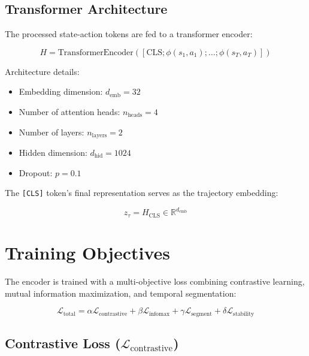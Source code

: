 \documentclass{article}
\begin{document}
\subsection{Transformer Architecture}

The processed state-action tokens are fed to a transformer encoder:

\begin{equation}
    H = \text{TransformerEncoder}([\text{CLS}; \phi(s_1, a_1); \ldots; \phi(s_T, a_T)])
\end{equation}

Architecture details:
\begin{itemize}
    \item Embedding dimension: $d_{\text{emb}} = 32$
    \item Number of attention heads: $n_{\text{heads}} = 4$
    \item Number of layers: $n_{\text{layers}} = 2$
    \item Hidden dimension: $d_{\text{hid}} = 1024$
    \item Dropout: $p = 0.1$
\end{itemize}

The \texttt{[CLS]} token's final representation serves as the trajectory embedding:

\begin{equation}
    z_\tau = H_{\text{CLS}} \in \mathbb{R}^{d_{\text{emb}}}
\end{equation}

\section{Training Objectives}

The encoder is trained with a multi-objective loss combining contrastive learning, mutual information maximization, and temporal segmentation:

\begin{equation}
    \mathcal{L}_{\text{total}} = \alpha \mathcal{L}_{\text{contrastive}} + \beta \mathcal{L}_{\text{infomax}} + \gamma \mathcal{L}_{\text{segment}} + \delta \mathcal{L}_{\text{stability}}
\end{equation}

\subsection{Contrastive Loss ($\mathcal{L}_{\text{contrastive}}$)}
\end{document}
